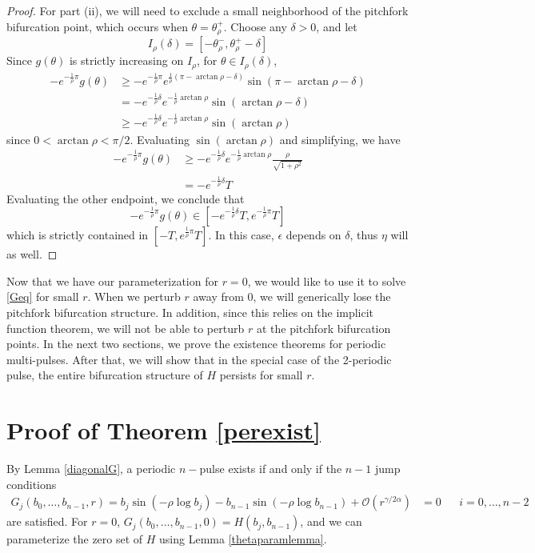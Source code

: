 \documentclass[thesis.tex]{subfiles}
\begin{document}
\begin{lemma}
\begin{proof}
For part (ii), we will need to exclude a small neighborhood of the pitchfork bifurcation point, which occurs when $\theta = \theta_\rho^+$. Choose any $\delta > 0$, and let 
\[
I_\rho(\delta) = [-\theta_\rho^-, \theta_\rho^+ - \delta]
\]
Since $g(\theta)$ is strictly increasing on $I_\rho$, for $\theta \in I_\rho(\delta)$,
\begin{align*}
-e^{ -\frac{1}{\rho} \pi } g(\theta) &\geq 
 -e^{ -\frac{1}{\rho} \pi } e^{ \frac{1}{\rho}(\pi - \arctan \rho - \delta) } \sin(\pi - \arctan \rho - \delta) \\
&= -e^{-\frac{1}{\rho}\delta} e^{-\frac{1}{\rho}\arctan\rho}\sin(\arctan \rho - \delta) \\
&\geq -e^{-\frac{1}{\rho}\delta} e^{-\frac{1}{\rho}\arctan\rho}\sin(\arctan \rho)
\end{align*}
since $0 < \arctan \rho < \pi/2$. Evaluating $\sin(\arctan\rho)$ and simplifying, we have
\begin{align*}
-e^{ -\frac{1}{\rho} \pi } g(\theta)
&\geq -e^{-\frac{1}{\rho}\delta} e^{-\frac{1}{\rho}\arctan\rho}\frac{\rho}{\sqrt{1 + \rho^2}} \\
&= -e^{-\frac{1}{\rho}\delta} T
\end{align*}
Evaluating the other endpoint, we conclude that
\[
-e^{ -\frac{1}{\rho} \pi } g(\theta)
\in [-e^{-\frac{1}{\rho}\delta} T, e^{-\frac{1}{\rho}\pi}T]
\]
which is strictly contained in $[-T,e^{\frac{1}{\rho}\pi}T]$. In this case, $\epsilon$ depends on $\delta$, thus $\eta$ will as well.
\end{proof}
\end{lemma}

Now that we have our parameterization for $r = 0$, we would like to use it to solve \eqref{Geq} for small $r$. When we perturb $r$ away from 0, we will generically lose the pitchfork bifurcation structure. In addition, since this relies on the implicit function theorem, we will not be able to perturb $r$ at the pitchfork bifurcation points. In the next two sections, we prove the existence theorems for periodic multi-pulses. After that, we will show that in the special case of the 2-periodic pulse, the entire bifurcation structure of $H$ persists for small $r$.

\section{Proof of Theorem \ref{perexist}}

By Lemma \ref{diagonalG}, a periodic $n-$pulse exists if and only if the $n-1$ jump conditions
\begin{align}\label{Geq2}
G_j(b_0, \dots, b_{n-1}, r) = b_j \sin \left( -\rho \log b_j \right) - b_{n-1} \sin \left( -\rho \log b_{n-1} \right) + \mathcal{O}(r^{\gamma / 2 \alpha}) &= 0 && i = 0, \dots, n-2
\end{align}
are satisfied. For $r = 0$, $G_j(b_0, \dots, b_{n-1}, 0) = H(b_j, b_{n-1})$, and we can parameterize the zero set of $H$ using Lemma \ref{thetaparamlemma}. 
\end{document}
